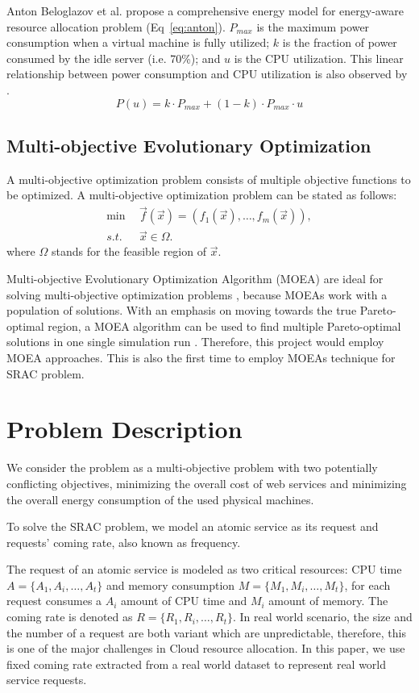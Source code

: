 Anton Beloglazov et al. \cite{Energy_Service_2} propose a comprehensive energy model for energy-aware resource allocation problem (Eq~\ref{eq:anton}). $P_{max}$ is the maximum power consumption when a virtual machine is fully utilized;
$k$ is the fraction of power consumed by the idle server (i.e. 70\%); and $u$ is the CPU utilization. This linear relationship between power consumption and CPU utilization is also observed by \cite{Energy_4, Energy_5}. 
\begin{equation}
\label{eq:anton}
  P(u) = k \cdot P_{max} + (1 - k) \cdot P_{max} \cdot u
\end{equation}


\subsection{Multi-objective Evolutionary Optimization}
A multi-objective optimization problem consists of multiple objective functions to be optimized.
A multi-objective optimization problem can be stated as follows:
\begin{align}
\min \ \ & \vec{f}(\vec{x}) = (f_1(\vec{x}), \dots, f_m(\vec{x})), \\
s.t. \ \ & \vec{x} \in \Omega.
\end{align}
where $\Omega$ stands for the feasible region of $\vec{x}$.

Multi-objective Evolutionary Optimization Algorithm (MOEA) are ideal for solving multi-objective optimization problems \cite{MOEA}, because MOEAs work with a population of solutions. With an emphasis on moving towards the true Pareto-optimal region, a MOEA algorithm can be used to find multiple Pareto-optimal solutions in one single simulation run \cite{ope}. Therefore, this project would employ MOEA approaches. This is also the first time to employ MOEAs technique for SRAC problem.

\section{Problem Description}
\label{sec:problem}
We consider the problem as a multi-objective problem with two potentially conflicting objectives, 
minimizing the overall cost of web services and minimizing the overall energy consumption of the used physical machines. 

To solve the SRAC problem, we model an atomic service as its request and requests' coming rate, also known as frequency. 


The request of an atomic service is modeled as two critical resources: 
CPU time $A = \{A_1, A_i, \dots, A_t \}$ and 
memory consumption $M = \{M_1, M_i, \dots, M_t \}$, 
for each request consumes a $A_i$ amount of CPU time 
and $M_i$ amount of memory. 
The coming rate is denoted as $R = \{R_1, R_i, \dots, R_t \}$. 
In real world scenario, the size and the number of a request are both variant 
which are unpredictable, therefore, this is one of the major challenges in Cloud resource allocation. 
In this paper, we use fixed coming rate extracted from a real world dataset to represent real world service requests. 
 
